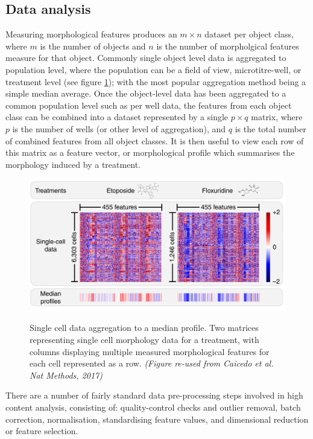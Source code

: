 \documentclass[a4paper,11pt,twoside,openright]{scrbook}
\begin{document}
\subsection{Data analysis}
Measuring morphological features produces an $m \times n$ dataset per object class, where $m$ is the number of objects and $n$ is the number of morpholgical features measure for that object.
Commonly single object level data is aggregated to population level, where the population can be a field of view, microtitre-well, or treatment level (see figure \ref{figure:aggregation}); with the most popular aggregation method being a simple median average. \cite{Caicedo2017}
Once the object-level data has been aggregated to a common population level such as per well data, the features from each object class can be combined into a dataset represented by a single $p \times q$ matrix, where $p$ is the number of wells (or other level of aggregation), and $q$ is the total number of combined features from all object classes.
It is then useful to view each row of this matrix as a feature vector, or morphological profile which summarises the morphology induced by a treatment.


\begin{figure}
    \captionsetup{width=0.8\textwidth}
    \caption[Single cell aggregation to a median profile]{Single cell data aggregation to a median profile. Two matrices representing single cell morphology data for a treatment, with columns displaying multiple measured morphological features for each cell represented as a row. \textit{(Figure re-used from Caicedo et al. Nat Methods, 2017)}}
    \includegraphics[width=0.8\linewidth]{figs/ch1SingleCellAggregation}
    \label{figure:aggregation}
\end{figure}


There are a number of fairly standard data pre-processing steps involved in high content analysis, consisting of: quality-control checks and outlier removal, batch correction, normalisation, standardising feature values, and dimensional reduction or feature selection. \cite{Caicedo2017}
\end{document}

